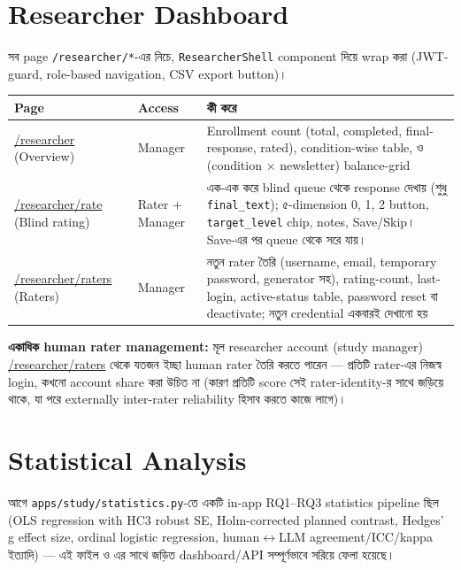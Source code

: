 \documentclass[11pt,a4paper]{article}
\newcommand{\code}[1]{\texttt{\small #1}}
\newcommand{\file}[1]{\texttt{\small #1}}
\newcommand{\pathcode}[1]{{\small\url{#1}}}
\newcommand{\summarybox}[1]{%
  \begin{center}
  \colorbox{softbg}{\parbox{0.94\textwidth}{#1}}
  \end{center}
}
\begin{document}
\newpage
\section{Researcher Dashboard}
\label{sec:dashboard}

সব page \code{/researcher/*}-এর নিচে, \code{ResearcherShell} component দিয়ে wrap করা
(JWT-guard, role-based navigation, CSV export button)।

\begin{longtable}{@{}p{3.0cm}p{2.2cm}p{10.8cm}@{}}
\toprule
\textbf{Page} & \textbf{Access} & \textbf{কী করে} \\
\midrule
\endhead
\pathcode{/researcher} (Overview) & Manager & Enrollment count (total, completed,
  final-response, rated), condition-wise table, ও (condition $\times$ newsletter)
  balance-grid \\
\pathcode{/researcher/rate} (Blind rating) & Rater \;+\; Manager & এক-এক করে blind queue
  থেকে response দেখায় (শুধু \code{final\_text}); ৫-dimension 0, 1, 2 button,
  \code{target\_level} chip, notes, Save/Skip। Save-এর পর queue থেকে সরে যায়। \\
\pathcode{/researcher/raters} (Raters) & Manager & নতুন rater তৈরি (username, email,
  temporary password, generator সহ), rating-count, last-login, active-status table, password
  reset বা deactivate; নতুন credential একবারই দেখানো হয় \\
\bottomrule
\end{longtable}

\summarybox{%
  \textbf{একাধিক human rater management:} মূল researcher account (study manager)
  \pathcode{/researcher/raters} থেকে যতজন ইচ্ছা human rater তৈরি করতে পারেন --- প্রতিটি
  rater-এর নিজস্ব login, কখনো account share করা উচিত না (কারণ প্রতিটি score সেই
  rater-identity-র সাথে জড়িয়ে থাকে, যা পরে externally inter-rater reliability হিসাব করতে
  কাজে লাগে)।
}

\newpage
\section{Statistical Analysis}
\label{sec:stats}

আগে \file{apps/study/statistics.py}-তে একটি in-app RQ1--RQ3 statistics pipeline ছিল (OLS
regression with HC3 robust SE, Holm-corrected planned contrast, Hedges' g effect size,
ordinal logistic regression, human$\leftrightarrow$LLM agreement/ICC/kappa ইত্যাদি) --- এই
ফাইল ও এর সাথে জড়িত dashboard/API সম্পূর্ণভাবে সরিয়ে ফেলা হয়েছে।
\end{document}
